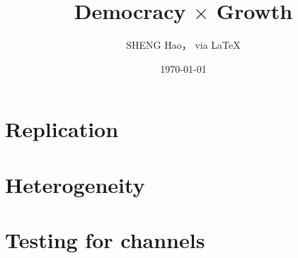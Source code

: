 \documentclass{article}
\begin{document}
\title{Democracy $\times$ Growth}
\author{{\normalsize SHENG Hao， via \LaTeX}}
\date{\today}

\maketitle

\def \Pr{{\rm Pr}}
\baselineskip 0.6cm

\section{Replication}

\newpage
\section{Heterogeneity}

\newpage
\section{Testing for channels}









\end{document}
